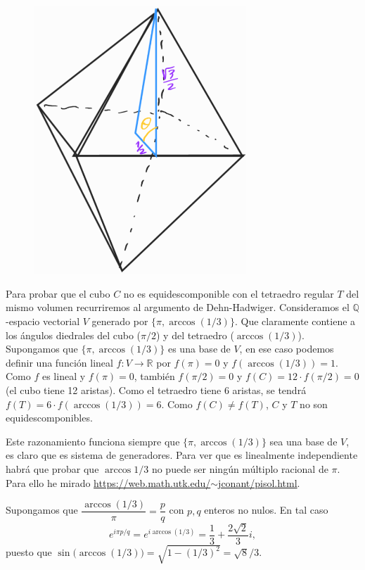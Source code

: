 \documentclass{amsart}
\begin{document}
\begin{figure}[H]
	\includegraphics[width=80mm]{imgs/diedral-octaedro}
\end{figure}

Para probar que el cubo $C$ no es equidescomponible con el tetraedro regular $T$ del mismo volumen recurriremos al argumento de Dehn-Hadwiger. Consideramos el $\mathbb{Q}$-espacio vectorial $V$ generado por $\{\pi,\arccos{(1/3)}\}$. Que claramente contiene a los ángulos diedrales del cubo ($\pi/2$) y del tetraedro ($\arccos{(1/3)}$). Supongamos que $\{\pi,\arccos{(1/3)}\}$ es una base de $V$, en ese caso podemos definir una función lineal $f:V\rightarrow\mathbb{R}$ por $f(\pi)=0$ y $f(\arccos{(1/3)})=1$. Como $f$ es lineal y $f(\pi)=0$, también $f(\pi/2)=0$ y $f(C)=12\cdot f(\pi/2)=0$ (el cubo tiene 12 aristas). Como el tetraedro tiene 6 aristas, se tendrá $f(T)=6\cdot f(\arccos{(1/3)})=6$. Como $f(C)\neq f(T)$, $C$ y $T$ no son equidescomponibles.

Este razonamiento funciona siempre que $\{\pi,\arccos{(1/3)}\}$ sea una base de $V$, es claro que es sistema de generadores. Para ver que es linealmente independiente habrá que probar que $\arccos{1/3}$ no puede ser ningún múltiplo racional de $\pi$. Para ello he mirado \href{https://web.math.utk.edu/~jconant/pisol.html}{https://web.math.utk.edu/$\mathtt{\sim}$jconant/pisol.html}.

Supongamos que $\dfrac{\arccos{(1/3)}}{\pi}=\dfrac{p}{q}$ con $p,q$ enteros no nulos. En tal caso %
\[e^{i\pi p/q}=e^{i\arccos{(1/3)}}=\frac{1}{3}+\frac{2\sqrt{2}}{3}i,\]
puesto que $\sin\big(\arccos{(1/3)}\big)=\sqrt{1-(1/3)^2}=\sqrt{8}/3$.
\end{document}
